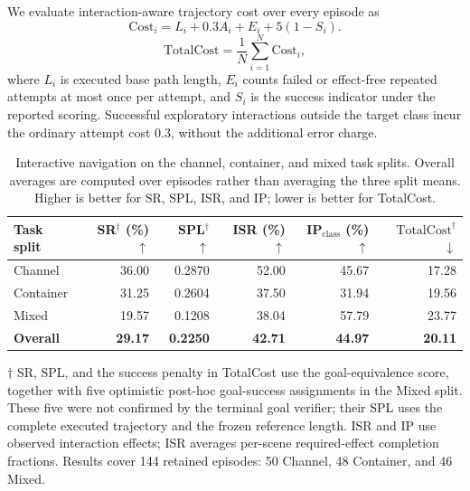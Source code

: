 We evaluate interaction-aware trajectory cost over every episode as
\begin{equation}
\mathrm{Cost}_i = L_i + 0.3 A_i + E_i + 5(1-S_i).
\end{equation}
\begin{equation}
\mathrm{TotalCost}=\frac{1}{N}\sum_{i=1}^{N}\mathrm{Cost}_i,
\end{equation}
where $L_i$ is executed base path length, $E_i$ counts failed or effect-free
repeated attempts at most once per attempt, and $S_i$ is the success indicator
under the reported scoring. Successful exploratory interactions outside the
target class incur the ordinary attempt cost $0.3$, without the additional
error charge.

\begin{table}[t]
  \centering
  \small
  \setlength{\tabcolsep}{5pt}
  \caption{Interactive navigation on the channel, container, and mixed task
  splits. Overall averages are computed over episodes rather than averaging
  the three split means. Higher is better for SR, SPL, ISR, and IP; lower is
  better for TotalCost.}
  \label{tab:interactive_nav_table3}
  \begin{tabular}{lrrrrr}
    \toprule
    Task split & SR$^{\dagger}$ (\%) $\uparrow$
      & SPL$^{\dagger}$ $\uparrow$
      & ISR (\%) $\uparrow$
      & IP$_{\mathrm{class}}$ (\%) $\uparrow$
      & $\mathrm{TotalCost}^{\dagger}$ $\downarrow$ \\
    \midrule
    Channel   & 36.00 & 0.2870 & 52.00 & 45.67 & 17.28 \\
    Container & 31.25 & 0.2604 & 37.50 & 31.94 & 19.56 \\
    Mixed     & 19.57 & 0.1208 & 38.04 & 57.79 & 23.77 \\
    \midrule
    \textbf{Overall} & \textbf{29.17} & \textbf{0.2250}
      & \textbf{42.71} & \textbf{44.97} & \textbf{20.11} \\
    \bottomrule
  \end{tabular}
  \par\vspace{3pt}
  \begin{minipage}{0.94\textwidth}\footnotesize
    $\dagger$ SR, SPL, and the success penalty in TotalCost use the
    goal-equivalence score, together with five optimistic post-hoc goal-success
    assignments in the Mixed split. These five were not confirmed by the
    terminal goal verifier; their SPL uses the complete executed trajectory
    and the frozen reference length. ISR and IP use observed interaction
    effects; ISR averages per-scene required-effect completion fractions.
    Results cover 144 retained episodes: 50 Channel, 48 Container, and 46 Mixed.
  \end{minipage}
\end{table}

